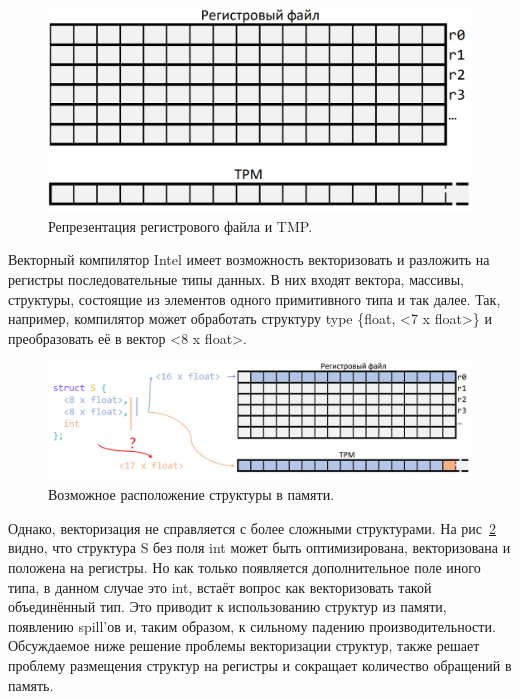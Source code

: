 \begin{figure}[ht]
    \centering
    \includegraphics[scale=0.17]{Images/grf_empty.png}
    \caption{Репрезентация регистрового файла и TMP.}
    \label{fig:mem}
\end{figure}

Векторный компилятор Intel имеет возможность векторизовать и разложить на регистры последовательные типы данных. В них входят вектора, массивы, структуры, состоящие из элементов одного примитивного типа и так далее.
Так, например, компилятор может обработать структуру type \{float, <7 x float>\} и преобразовать её в вектор <8 x float>.

\begin{figure}[ht]
    \centering
    \includegraphics[scale=0.22]{Images/struct.png}
    \caption{Возможное расположение структуры в памяти.}
    \label{fig:lying}
\end{figure}

Однако, векторизация не справляется с более сложными структурами. На рис~\ref{fig:lying} видно, что структура S без поля int может быть оптимизирована, векторизована и положена на регистры.
Но как только появляется дополнительное поле иного типа, в данном случае это int, встаёт вопрос как векторизовать такой объединённый тип.
Это приводит к использованию структур из памяти, появлению spill'ов и, таким образом, к сильному падению производительности.
Обсуждаемое ниже решение проблемы векторизации структур, также решает проблему размещения структур на регистры и сокращает количество обращений в память.
